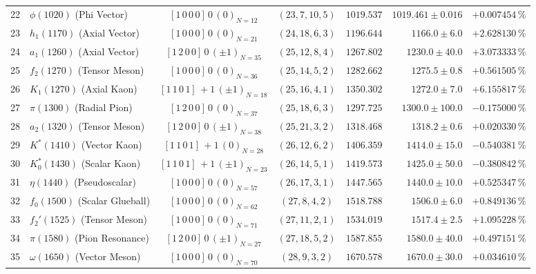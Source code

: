 \documentclass[
    12pt,
    a4paper,
    headings=normal,
    twoside=false,
    open=any,
    parskip=half
]{scrbook}
\begin{document}
\begin{longtable}{clccrrr}
22 & $\phi(1020)$ (Phi Vector) & $[1 \, 0 \, 0 \, 0] \, 0 \, (0)_{N=12}$ & $(23, 7, 10, 5)$ & $1019.537$ & $1019.461 \pm 0.016$ & $+0.007454\,\%$ \\
23 & $h_1(1170)$ (Axial Vector) & $[1 \, 0 \, 0 \, 0] \, 0 \, (0)_{N=21}$ & $(24, 18, 6, 3)$ & $1196.644$ & $1166.0 \pm 6.0$ & $+2.628130\,\%$ \\
24 & $a_1(1260)$ (Axial Vector) & $[1 \, 2 \, 0 \, 0] \, 0 \, (\pm 1)_{N=35}$ & $(25, 12, 8, 4)$ & $1267.802$ & $1230.0 \pm 40.0$ & $+3.073333\,\%$ \\
25 & $f_2(1270)$ (Tensor Meson) & $[1 \, 0 \, 0 \, 0] \, 0 \, (0)_{N=36}$ & $(25, 14, 5, 2)$ & $1282.662$ & $1275.5 \pm 0.8$ & $+0.561505\,\%$ \\
26 & $K_1(1270)$ (Axial Kaon) & $[1 \, 1 \, 0 \, 1] \, +1 \, (\pm 1)_{N=18}$ & $(25, 16, 4, 1)$ & $1350.302$ & $1272.0 \pm 7.0$ & $+6.155817\,\%$ \\
27 & $\pi(1300)$ (Radial Pion) & $[1 \, 2 \, 0 \, 0] \, 0 \, (0)_{N=37}$ & $(25, 18, 6, 3)$ & $1297.725$ & $1300.0 \pm 100.0$ & $-0.175000\,\%$ \\
28 & $a_2(1320)$ (Tensor Meson) & $[1 \, 2 \, 0 \, 0] \, 0 \, (\pm 1)_{N=38}$ & $(25, 21, 3, 2)$ & $1318.468$ & $1318.2 \pm 0.6$ & $+0.020330\,\%$ \\
29 & $K^*(1410)$ (Vector Kaon) & $[1 \, 1 \, 0 \, 1] \, +1 \, (0)_{N=28}$ & $(26, 12, 6, 2)$ & $1406.359$ & $1414.0 \pm 15.0$ & $-0.540381\,\%$ \\
30 & $K_0^*(1430)$ (Scalar Kaon) & $[1 \, 1 \, 0 \, 1] \, +1 \, (\pm 1)_{N=23}$ & $(26, 14, 5, 1)$ & $1419.573$ & $1425.0 \pm 50.0$ & $-0.380842\,\%$ \\
31 & $\eta(1440)$ (Pseudoscalar) & $[1 \, 0 \, 0 \, 0] \, 0 \, (0)_{N=57}$ & $(26, 17, 3, 1)$ & $1447.565$ & $1440.0 \pm 10.0$ & $+0.525347\,\%$ \\
32 & $f_0(1500)$ (Scalar Glueball) & $[1 \, 0 \, 0 \, 0] \, 0 \, (0)_{N=62}$ & $(27, 8, 4, 2)$ & $1518.788$ & $1506.0 \pm 6.0$ & $+0.849136\,\%$ \\
33 & $f_2'(1525)$ (Tensor Meson) & $[1 \, 0 \, 0 \, 0] \, 0 \, (0)_{N=71}$ & $(27, 11, 2, 1)$ & $1534.019$ & $1517.4 \pm 2.5$ & $+1.095228\,\%$ \\
34 & $\pi(1580)$ (Pion Resonance) & $[1 \, 2 \, 0 \, 0] \, 0 \, (\pm 1)_{N=27}$ & $(27, 18, 5, 2)$ & $1587.855$ & $1580.0 \pm 40.0$ & $+0.497151\,\%$ \\
35 & $\omega(1650)$ (Vector Meson) & $[1 \, 0 \, 0 \, 0] \, 0 \, (0)_{N=70}$ & $(28, 9, 3, 2)$ & $1670.578$ & $1670.0 \pm 30.0$ & $+0.034610\,\%$ \\

\end{longtable}
\end{document}
